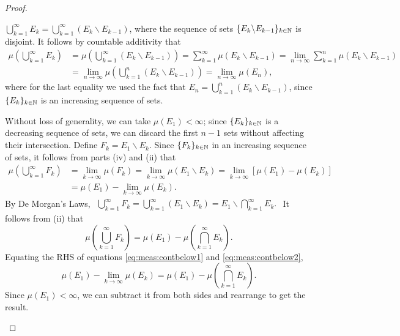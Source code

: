 \documentclass[main.tex]{subfiles}
\begin{document}
\begin{theorem}
\begin{proof}
\begin{romannum}
$\bigcup_{k=1}^\infty E_k = \bigcup_{k=1}^\infty (E_k\backslash E_{k-1})$, where the sequence of sets $\{E_k\backslash E_{k-1}\}_{k\in{\mathbb N}}$ is disjoint. It follows by countable additivity that 
\begin{align*}
\mu\left( \bigcup_{k=1}^\infty E_k \right) &= \mu\left( \bigcup_{k=1}^\infty (E_k\backslash E_{k-1}) \right)
= \sum_{k=1}^\infty \mu(E_k\backslash E_{k-1}) = \lim_{n \rightarrow \infty} \sum_{k=1}^n \mu(E_k\backslash E_{k-1}) \\
&= \lim_{n \rightarrow \infty} \mu \left( \bigcup_{k=1}^n (E_k\backslash E_{k-1}) \right) 
= \lim_{n\rightarrow \infty} \mu(E_n),
\end{align*}
where for the last equality we used the fact that $E_n = \bigcup_{k=1}^n (E_k\backslash E_{k-1})$, since $\{ E_k\}_{k \in {\mathbb N}}$ is an increasing sequence of sets.
\item Without loss of generality, we can take $\mu(E_1) < \infty$; since $\{ E_k\}_{k \in {\mathbb N}}$ is a decreasing sequence of sets, we can discard the first $n-1$ sets without affecting their intersection. Define $F_k = E_1 \backslash E_k$. Since $\{ F_k\}_{k \in {\mathbb N}}$ in an increasing sequence of sets, it follows from parts (iv) and (ii) that 
\begin{equation}\label{eq:meas:contbelow1}
\begin{aligned}
\mu\left( \bigcup_{k=1}^\infty F_k\right) &= \lim_{k\rightarrow \infty}\mu(F_k)
= \lim_{k\rightarrow \infty}\mu(E_1 \backslash E_k) 
= \lim_{k\rightarrow \infty}\left[\mu(E_1) - \mu(E_k)\right] \\
&= \mu(E_1) - \lim_{k\rightarrow \infty} \mu(E_k).
\end{aligned}
\end{equation}
By De Morgan's Laws,
$\begin{aligned}
\bigcup_{k=1}^\infty F_k = \bigcup_{k=1}^\infty (E_1\backslash E_k) = E_1 \backslash \bigcap_{k=1}^\infty E_k.
\end{aligned}
$
It follows from (ii) that
\begin{equation}\label{eq:meas:contbelow2}
\mu\left( \bigcup_{k=1}^\infty F_k \right) = \mu(E_1) - \mu\left(\bigcap_{k=1}^\infty E_k \right).
\end{equation}
Equating the RHS of equations \cref{eq:meas:contbelow1} and \cref{eq:meas:contbelow2},
\[
\mu(E_1) - \lim_{k\rightarrow \infty} \mu(E_k) = \mu(E_1) - \mu\left(\bigcap_{k=1}^\infty E_k \right).
\]
Since $\mu(E_1) < \infty$, we can subtract it from both sides and rearrange to get the result.
\end{romannum}
\end{proof}
\end{theorem}
\end{document}
